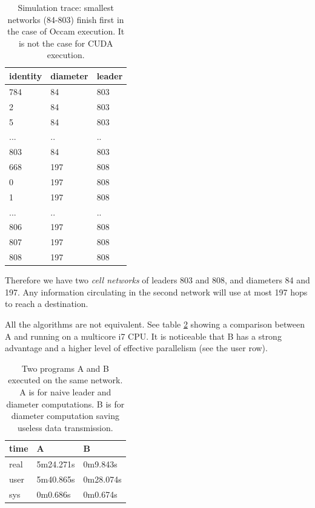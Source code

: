\begin{table}[htb]
\begin{center}
\begin{tabular}{|l|l|l|}\hline
identity  & diameter  & leader \\\hline
 784&	  84& 803\\\hline
   2	&  84 &803\\\hline
   5	&  84 &803\\\hline
... & .. & ..\\\hline
 803&	  84& 803\\\hline
 668&	 197& 808\\\hline
   0	& 197& 808\\\hline
   1	& 197& 808\\\hline
... & .. & ..\\\hline
 806	& 197& 808\\\hline
 807	& 197& 808\\\hline
 808	& 197& 808\\\hline
\end{tabular}
\caption{Simulation trace: smallest networks (84-803)  finish first in the case of Occam execution.
It is not the case for CUDA execution. }
\label{tab:uneTableTrace}
\end{center}
\end{table}

Therefore we have two {\sl cell networks } of leaders 803 and 808, and diameters 84 and 197.
Any information circulating in the second network will use at most 197 hops to
reach a destination.

All the algorithms  are not equivalent. See table \ref{tab:uneTableBench} showing a comparison between A and 
running on a multicore i7 CPU. It is noticeable that B has a strong advantage and a higher level
of effective parallelism (see the user row).

\begin{table}[htb]
\begin{center}
\begin{tabular}{|l|l|l|}\hline 
time &  A & B \\\hline
real &  5m24.271s &     0m9.843s\\\hline
user &  5m40.865s &     0m28.074s\\\hline
sys  &  0m0.686s  &     0m0.674s\\\hline
\end{tabular}
\caption{ Two programs A and B executed on the same network. A is for naive
leader and diameter computations. B is for diameter computation saving useless
data transmission. }
\label{tab:uneTableBench}
\end{center}
\end{table}

